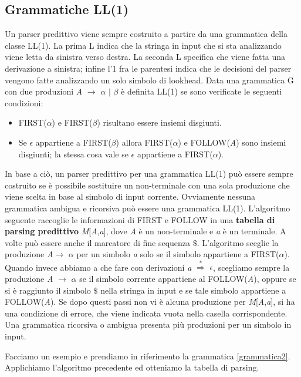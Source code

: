 \subsection{Grammatiche LL(1)}
Un parser predittivo viene sempre costruito a partire da una grammatica della classe LL(1). La prima L \cite{libro: compilatori} indica che la stringa in input che si sta analizzando viene letta da sinistra verso destra. La seconda L specifica che viene fatta una derivazione a sinistra; infine l'1 fra le parentesi indica che le decisioni del parser vengono fatte analizzando un solo simbolo di lookhead. Data una grammatica G con due produzioni \textit{A} $\to$ $\alpha$ $\mid$ $\beta$ è definita LL(1) se sono verificate le seguenti condizioni:
\begin{itemize}
	\item FIRST($\alpha$) e FIRST($\beta$) risultano essere insiemi disgiunti.
	\item Se $\epsilon$ appartiene a FIRST($\beta$) allora FIRST($\alpha$) e FOLLOW(\textit{A}) sono insiemi disgiunti; la stessa cosa vale se $\epsilon$ appartiene a FIRST($\alpha$).
\end{itemize}
In base a ciò, un parser predittivo per una grammatica LL(1) può essere sempre costruito se è possibile sostituire un non-terminale con una sola produzione che viene scelta in base al simbolo di input corrente. Ovviamente nessuna grammatica ambigua e ricorsiva può essere una grammatica LL(1). L'algoritmo seguente raccoglie le informazioni di FIRST e FOLLOW in una \textbf{tabella di parsing predittivo} \textit{M}[\textit{A},\textit{a}], dove \textit{A} è un non-terminale e \textit{a} è un terminale. A volte può essere anche il marcatore di fine sequenza $\$$. L'algoritmo sceglie la produzione \textit{A}$\to$ $\alpha$ per un simbolo \textit{a} solo se il simbolo appartiene a FIRST($\alpha$). Quando invece abbiamo a che fare con derivazioni \textit{a} $\overset{*}{\Rightarrow}$ $\epsilon$, scegliamo sempre la produzione \textit{A} $\to$ $\alpha$ se il simbolo corrente appartiene al FOLLOW(\textit{A}), oppure se si è raggiunto il simbolo $\$$ nella stringa in input e se tale simbolo appartiene a FOLLOW(\textit{A}). Se dopo questi passi non vi è alcuna produzione per \textit{M}[\textit{A},\textit{a}], si ha una condizione di errore, che viene indicata vuota nella casella corrispondente. Una grammatica ricorsiva o ambigua presenta più produzioni per un simbolo in input.\par 
\noindent Facciamo un esempio e prendiamo in riferimento la grammatica \ref{grammatica2}. Applichiamo l'algoritmo precedente ed otteniamo la tabella di parsing.\par
